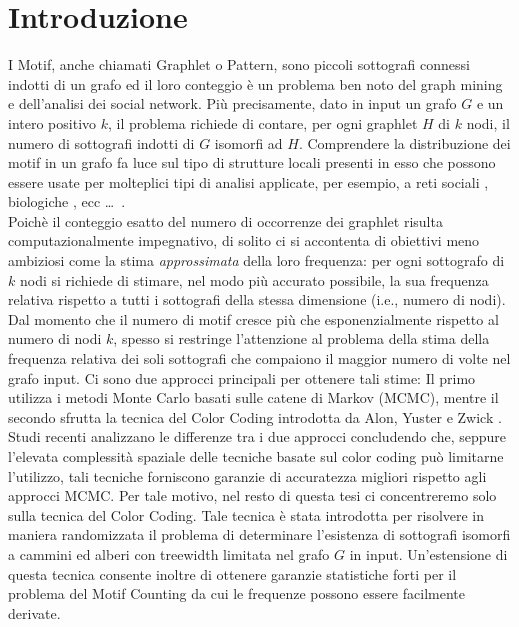 \chapter{Introduzione}

I Motif, anche chiamati Graphlet o Pattern, sono piccoli sottografi connessi indotti di un grafo ed il loro conteggio è un problema ben noto del graph mining e dell'analisi dei social network. Pi\`u precisamente, dato in input un grafo $G$ e un intero positivo $k$, il problema richiede di contare,  per ogni graphlet $H$ di $k$ nodi, il numero di sottografi indotti di $G$ isomorfi ad $H$.
Comprendere la distribuzione dei motif in un grafo fa luce sul tipo di strutture locali presenti in esso che possono essere usate per molteplici tipi di analisi applicate, per esempio, a reti sociali \cite{bhuiyan2012guise,zhao2010subgraph,boldi2011layered}, biologiche \cite{alon2008biomolecular}, ecc \dots \ .\\
Poich\`e il conteggio esatto del numero di occorrenze dei graphlet risulta computazionalmente impegnativo, di solito ci si accontenta di obiettivi meno ambiziosi come la stima \emph{approssimata} della loro frequenza: per ogni sottografo di $k$ nodi si richiede di stimare, nel modo pi\`u accurato possibile, la sua frequenza relativa rispetto a tutti i sottografi della stessa dimensione (i.e., numero di nodi).
Dal momento che il numero di motif cresce più che esponenzialmente rispetto al numero di nodi $k$, spesso si restringe l'attenzione al problema della stima della frequenza relativa dei soli sottografi che compaiono il maggior numero di volte nel grafo input.
Ci sono due approcci principali per ottenere tali stime:
Il primo utilizza i metodi Monte Carlo basati sulle catene di Markov (MCMC), mentre il secondo sfrutta la tecnica del Color Coding introdotta da Alon, Yuster e Zwick \cite{alon1995color}.
Studi recenti analizzano le differenze tra i due approcci concludendo che, seppure  l'elevata complessit\`a spaziale delle tecniche basate sul color coding può limitarne l'utilizzo, tali tecniche forniscono garanzie di accuratezza migliori rispetto agli approcci MCMC.
Per tale motivo, nel resto di questa tesi ci concentreremo solo sulla tecnica del Color Coding.
Tale tecnica \`e stata introdotta per risolvere in maniera randomizzata il problema di determinare l'esistenza di sottografi isomorfi a cammini ed alberi con treewidth limitata nel grafo $G$ in input.
Un'estensione di questa tecnica consente inoltre di ottenere garanzie statistiche forti per il problema del Motif Counting da cui le frequenze possono essere facilmente derivate.
